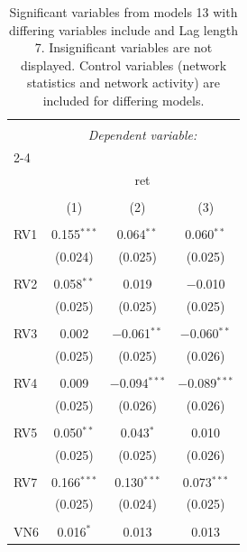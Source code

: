 
\begin{table}[!htbp] \centering 
  \caption{Significant variables from models 13 with differing variables include 
                               and Lag length 7. Insignificant variables are not displayed. 
                               Control variables (network statistics and network activity) are 
                               included for differing models.} 
  \label{RVmodels2_t} 
\scriptsize 
\begin{tabular}{@{\extracolsep{5pt}}lccc} 
\\[-1.8ex]\hline 
\hline \\[-1.8ex] 
 & \multicolumn{3}{c}{\textit{Dependent variable:}} \\ 
\cline{2-4} 
\\[-1.8ex] & \multicolumn{3}{c}{ret} \\ 
\\[-1.8ex] & (1) & (2) & (3)\\ 
\hline \\[-1.8ex] 
 RV1 & 0.155$^{***}$ & 0.064$^{**}$ & 0.060$^{**}$ \\ 
  & (0.024) & (0.025) & (0.025) \\ 
  & & & \\ 
 RV2 & 0.058$^{**}$ & 0.019 & $-$0.010 \\ 
  & (0.025) & (0.025) & (0.025) \\ 
  & & & \\ 
 RV3 & 0.002 & $-$0.061$^{**}$ & $-$0.060$^{**}$ \\ 
  & (0.025) & (0.025) & (0.026) \\ 
  & & & \\ 
 RV4 & 0.009 & $-$0.094$^{***}$ & $-$0.089$^{***}$ \\ 
  & (0.025) & (0.026) & (0.026) \\ 
  & & & \\ 
 RV5 & 0.050$^{**}$ & 0.043$^{*}$ & 0.010 \\ 
  & (0.025) & (0.025) & (0.026) \\ 
  & & & \\ 
 RV7 & 0.166$^{***}$ & 0.130$^{***}$ & 0.073$^{***}$ \\ 
  & (0.025) & (0.024) & (0.025) \\ 
  & & & \\ 
 VN6 & 0.016$^{*}$ & 0.013 & 0.013 \\ 

\end{tabular}
\end{table}
